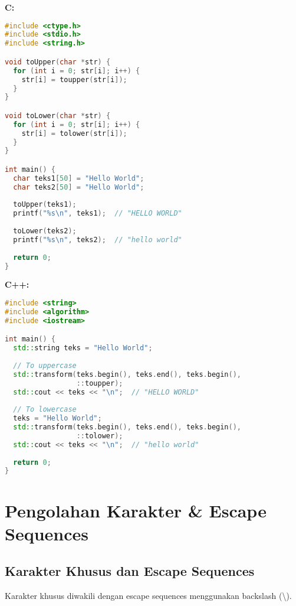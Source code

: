 \documentclass[../main.tex]{subfiles}
\begin{document}
\textbf{C:}
\begin{lstlisting}[language=C, caption={Case conversion di C}]
#include <ctype.h>
#include <stdio.h>
#include <string.h>

void toUpper(char *str) {
  for (int i = 0; str[i]; i++) {
    str[i] = toupper(str[i]);
  }
}

void toLower(char *str) {
  for (int i = 0; str[i]; i++) {
    str[i] = tolower(str[i]);
  }
}

int main() {
  char teks1[50] = "Hello World";
  char teks2[50] = "Hello World";
  
  toUpper(teks1);
  printf("%s\n", teks1);  // "HELLO WORLD"
  
  toLower(teks2);
  printf("%s\n", teks2);  // "hello world"
  
  return 0;
}
\end{lstlisting}

\textbf{C++:}
\begin{lstlisting}[language=C++, caption={Case conversion di C++}]
#include <string>
#include <algorithm>
#include <iostream>

int main() {
  std::string teks = "Hello World";
  
  // To uppercase
  std::transform(teks.begin(), teks.end(), teks.begin(), 
                 ::toupper);
  std::cout << teks << "\n";  // "HELLO WORLD"
  
  // To lowercase
  teks = "Hello World";
  std::transform(teks.begin(), teks.end(), teks.begin(), 
                 ::tolower);
  std::cout << teks << "\n";  // "hello world"
  
  return 0;
}
\end{lstlisting}

\section{Pengolahan Karakter \& Escape Sequences}

\subsection{Karakter Khusus dan Escape Sequences}

Karakter khusus diwakili dengan escape sequences menggunakan backslash (\textbackslash).
\end{document}
